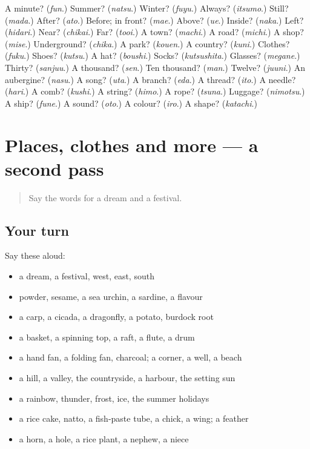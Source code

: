 \begin{tcolorbox}[breakable,colback=teal!4,colframe=teal!35!black,title={Before you move on}]
A minute? (\emph{fun}.) Summer? (\emph{natsu}.) Winter? (\emph{fuyu}.) Always? (\emph{itsumo}.) Still? (\emph{mada}.) After? (\emph{ato}.) Before; in front? (\emph{mae}.) Above? (\emph{ue}.) Inside? (\emph{naka}.) Left? (\emph{hidari}.) Near? (\emph{chikai}.) Far? (\emph{tooi}.) A town? (\emph{machi}.) A road? (\emph{michi}.) A shop? (\emph{mise}.) Underground? (\emph{chika}.) A park? (\emph{kouen}.) A country? (\emph{kuni}.) Clothes? (\emph{fuku}.) Shoes? (\emph{kutsu}.) A hat? (\emph{boushi}.) Socks? (\emph{kutsushita}.) Glasses? (\emph{megane}.) Thirty? (\emph{sanjuu}.) A thousand? (\emph{sen}.) Ten thousand? (\emph{man}.) Twelve? (\emph{juuni}.) An aubergine? (\emph{nasu}.) A song? (\emph{uta}.) A branch? (\emph{eda}.) A thread? (\emph{ito}.) A needle? (\emph{hari}.) A comb? (\emph{kushi}.) A string? (\emph{himo}.) A rope? (\emph{tsuna}.) Luggage? (\emph{nimotsu}.) A ship? (\emph{fune}.) A sound? (\emph{oto}.) A colour? (\emph{iro}.) A shape? (\emph{katachi}.)
\end{tcolorbox}
\section[(dialogue)]{Places, clothes and more — a second pass}

\label{lesson:JA-R71-second-pass-places-clothes-and-more}



\begin{quote}
Say the words for a dream and a festival.
\end{quote}

\subsection*{Your turn}
Say these aloud:

\begin{itemize}
\raggedright
  \item a dream, a festival, west, east, south
  \item powder, sesame, a sea urchin, a sardine, a flavour
  \item a carp, a cicada, a dragonfly, a potato, burdock root
  \item a basket, a spinning top, a raft, a flute, a drum
  \item a hand fan, a folding fan, charcoal; a corner, a well, a beach
  \item a hill, a valley, the countryside, a harbour, the setting sun
  \item a rainbow, thunder, frost, ice, the summer holidays
  \item a rice cake, natto, a fish-paste tube, a chick, a wing; a feather
  \item a horn, a hole, a rice plant, a nephew, a niece
\end{itemize}

